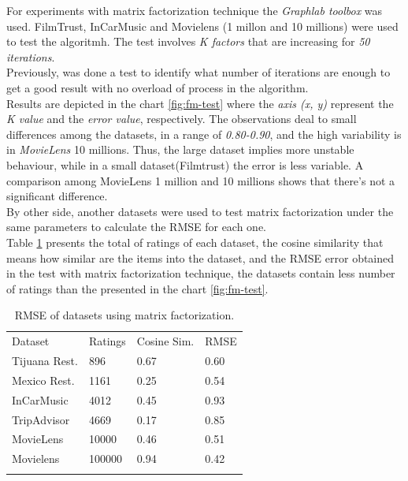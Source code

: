 For experiments with matrix factorization technique the \textit{Graphlab
toolbox} was used. FilmTrust, InCarMusic and Movielens (1 millon and
10 millions) were used to test the algoritmh. The test involves \textit{K
factors} that are increasing for \textit{50 iterations}.\\ Previously, was 
done a test to identify what number of iterations are enough to get a good
result with no overload of process in the algorithm. \\ Results are
depicted in the chart \ref{fig:fm-test} where the \textit{axis (x, y)}
represent the \textit{K value} and the \textit{error value}, respectively. 
The observations deal to small differences among the datasets, in a range
of \textit{0.80-0.90}, and the high variability is in \textit{MovieLens} 10
millions. Thus, the large dataset implies more unstable 
behaviour, while in a small dataset(Filmtrust) the error is less variable.
A comparison among MovieLens 1 million and 10 millions shows that 
there's not a significant difference. \\ 
By other side, another datasets were used to test matrix factorization
under the same parameters to calculate the RMSE for each one.\\ Table
\ref{tab:mf-set} presents the total of ratings of each dataset, the
cosine similarity that means how similar are the items into the
dataset, and the RMSE error obtained in the test with matrix
factorization technique, the datasets contain less number of ratings than
the presented in the chart \ref{fig:fm-test}. 
\begin{table}
\centering
\small
\captionsetup{font=footnotesize}
\caption{RMSE of datasets using matrix factorization.}
\label{tab:mf-set}   
\begin{tabular}{llll}
\hline\noalign{\smallskip}
Dataset & Ratings & Cosine Sim. & RMSE \\
\noalign{\smallskip}\hline\noalign{\smallskip}
Tijuana Rest.  &    896       &  0.67    &   0.60 \\
Mexico Rest.  &   1161       &  0.25    &  0.54 \\
InCarMusic    &    4012      &  0.45     &  0.93 \\
TripAdvisor    &    4669      &  0.17     &  0.85 \\
MovieLens    &    10000     &   0.46    &  0.51 \\
Movielens    &     100000   &   0.94    &  0.42 \\
\noalign{\smallskip}\hline
\end{tabular}
\end{table}

